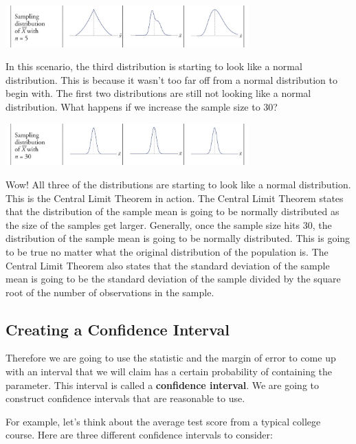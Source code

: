 \documentclass[
  letterpaper,
  DIV=11,
  numbers=noendperiod]{scrreprt}
\begin{document}
\includegraphics[width=0.7\textwidth,height=\textheight]{./images/EPCI_5.jpg}

In this scenario, the third distribution is starting to look like a
normal distribution. This is because it wasn't too far off from a normal
distribution to begin with. The first two distributions are still not
looking like a normal distribution. What happens if we increase the
sample size to 30?

\includegraphics[width=0.7\textwidth,height=\textheight]{./images/EPCI_6.jpg}

Wow! All three of the distributions are starting to look like a normal
distribution. This is the Central Limit Theorem in action. The Central
Limit Theorem states that the distribution of the sample mean is going
to be normally distributed as the size of the samples get larger.
Generally, once the sample size hits 30, the distribution of the sample
mean is going to be normally distributed. This is going to be true no
matter what the original distribution of the population is. The Central
Limit Theorem also states that the standard deviation of the sample mean
is going to be the standard deviation of the sample divided by the
square root of the number of observations in the sample.

\subsection*{Creating a Confidence
Interval}\label{creating-a-confidence-interval}

Therefore we are going to use the statistic and the margin of error to
come up with an interval that we will claim has a certain probability of
containing the parameter. This interval is called a \textbf{confidence
interval}. We are going to construct confidence intervals that are
reasonable to use.

For example, let's think about the average test score from a typical
college course. Here are three different confidence intervals to
consider:
\end{document}

